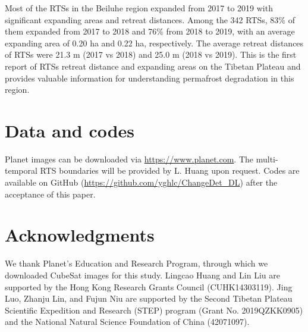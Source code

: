\documentclass[authoryear,preprint,review,12pt]{elsarticle}
\begin{document}
Most of the RTSs in the Beiluhe region expanded from 2017 to 2019 with significant expanding areas and retreat distances. 
Among the 342 RTSs, 83\% of them expanded from 2017 to 2018 and 76\% from 2018 to 2019, with an average expanding area of 0.20 ha and 0.22 ha, respectively.
The average retreat distances of RTSs were 21.3 m (2017 vs 2018) and 25.0 m (2018 vs 2019).
This is the first report of RTSs retreat distance and expanding areas on the Tibetan Plateau and provides valuable information for understanding permafrost degradation in this region. 


\section{Data and codes}
\label{sec_data_codes}

Planet images can be downloaded via \url{https://www.planet.com}. 
The multi-temporal RTS boundaries will be provided by L. Huang upon request. 
Codes are available on GitHub (\url{https://github.com/yghlc/ChangeDet_DL}) after the acceptance of this paper.

\section{Acknowledgments}
\label{sec_acknowledgments}


We thank Planet's Education and Research Program, through which we downloaded CubeSat images for this study. 
Lingcao Huang and Lin Liu are supported by the Hong Kong Research Grants Council (CUHK14303119).
Jing Luo, Zhanju Lin, and Fujun Niu are supported by the Second Tibetan Plateau Scientific Expedition and Research (STEP) program (Grant No. 2019QZKK0905) and the National Natural Science Foundation of China (42071097).



\end{document}
